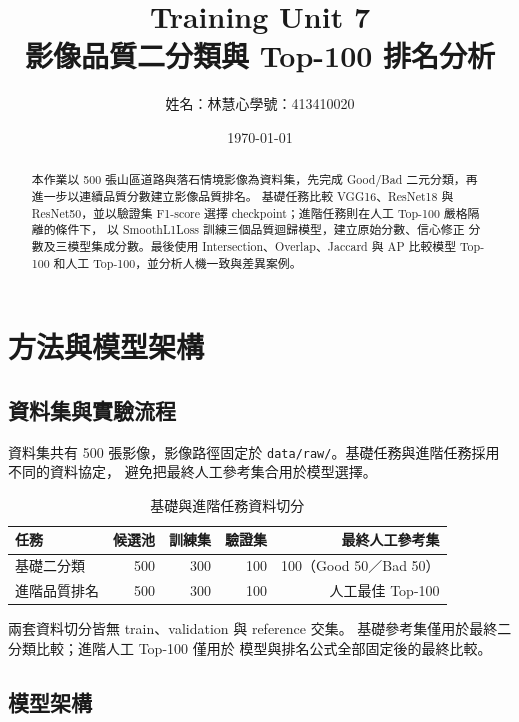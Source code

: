 \documentclass[12pt,a4paper,fontset=none]{ctexart}
\title{\textbf{Training Unit 7}\\影像品質二分類與 Top-100 排名分析}
\author{姓名：林慧心\qquad 學號：413410020}
\date{\today}
\begin{document}
\maketitle
\begin{abstract}
本作業以 500 張山區道路與落石情境影像為資料集，先完成
Good/Bad 二元分類，再進一步以連續品質分數建立影像品質排名。
基礎任務比較 VGG16、ResNet18 與 ResNet50，並以驗證集 F1-score
選擇 checkpoint；進階任務則在人工 Top-100 嚴格隔離的條件下，
以 SmoothL1Loss 訓練三個品質迴歸模型，建立原始分數、信心修正
分數及三模型集成分數。最後使用 Intersection、Overlap、Jaccard
與 AP 比較模型 Top-100 和人工 Top-100，並分析人機一致與差異案例。
\end{abstract}

\tableofcontents
\clearpage

\section{方法與模型架構}
\label{sec:methodology}

\subsection{資料集與實驗流程}
\label{subsec:dataset-protocol}

資料集共有 500 張影像，影像路徑固定於
\texttt{data/raw/}。基礎任務與進階任務採用不同的資料協定，
避免把最終人工參考集合用於模型選擇。

\begin{table}[H]
  \centering
  \caption{基礎與進階任務資料切分}
  \label{tab:data-splits}
  \begin{tabular}{lrrrr}
    \toprule
    任務 & 候選池 & 訓練集 & 驗證集 & 最終人工參考集 \\
    \midrule
    基礎二分類 & 500 & 300 & 100 & 100（Good 50／Bad 50）\\
    進階品質排名 & 500 & 300 & 100 & 人工最佳 Top-100 \\
    \bottomrule
  \end{tabular}
\end{table}

兩套資料切分皆無 train、validation 與 reference 交集。
基礎參考集僅用於最終二分類比較；進階人工 Top-100 僅用於
模型與排名公式全部固定後的最終比較。

\subsection{模型架構}
\label{subsec:model-architectures}
\end{document}
